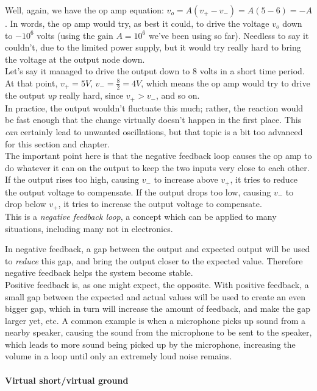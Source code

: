 Well, again, we have the op amp equation: $v_o = A(v_+ - v_-) = A(5 - 6) = -A$. In words, the op amp would try, as best it could, to drive the voltage $v_o$ down to $-10^6$ volts (using the gain $A=10^6$ we've been using so far). Needless to say it couldn't, due to the limited power supply, but it would try really hard to bring the voltage at the output node down.\\
Let's say it managed to drive the output down to 8 volts in a short time period. At that point, $v_+ = 5V$, $\displaystyle v_- = \frac{8}{2} = 4V$, which means the op amp would try to drive the output \emph{up} really hard, since $v_+ > v_-$, and so on.\\
In practice, the output wouldn't fluctuate this much; rather, the reaction would be fast enough that the change virtually doesn't happen in the first place. This \emph{can} certainly lead to unwanted oscillations, but that topic is a bit too advanced for this section and chapter.\\

The important point here is that the negative feedback loop causes the op amp to do whatever it can on the output to keep the two inputs very close to each other. If the output rises too high, causing $v_-$ to increase above $v_+$, it tries to reduce the output voltage to compensate. If the output drops too low, causing $v_-$ to drop below $v_+$, it tries to increase the output voltage to compensate.\\
This is a \emph{negative feedback loop}, a concept which can be applied to many situations, including many not in electronics.

In negative feedback, a gap between the output and expected output will be used to \emph{reduce} this gap, and bring the output closer to the expected value. Therefore negative feedback helps the system become stable.\\

Positive feedback is, as one might expect, the opposite. With positive feedback, a small gap between the expected and actual values will be used to create an even bigger gap, which in turn will increase the amount of feedback, and make the gap larger yet, etc. A common example is when a microphone picks up sound from a nearby speaker, causing the sound from the microphone to be sent to the speaker, which leads to more sound being picked up by the microphone, increasing the volume in a loop until only an extremely loud noise remains.

\paragraph{Virtual short/virtual ground}

